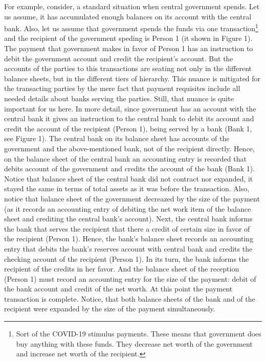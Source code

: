 For example, consider, a standard situation when central government
spends. Let us assume, it has accumulated enough balances on its account
with the central bank. Also, let us assume that government spends the
funds via one transaction\footnote{Sort of the COVID-19 stimulus payments. These means that
    government does buy anything with these funds. They decrease net
    worth of the government and increase net worth of the recipient.} and the recipient of the government
speding is Person 1 (it shown in Figure 1). The payment that government
makes in favor of Person 1 has an instruction to debit the government
account and credit the recipient's account. But the accounts of the
parties to this transactions are seating not only in the different
balance sheets, but in the different tiers of hierarchy. This nuance is
mitigated for the transacting parties by the mere fact that payment
requisites include all needed details about banks serving the parties.
Still, that nuance is quite important for us here. In more detail, since
government has an account with the central bank it gives an instruction
to the central bank to debit its account and credit the account of the
recipient (Person 1), being served by a bank (Bank 1, see Figure 1). The
central bank on its balance sheet has accounts of the government and the
above-mentioned bank, not of the recipient directly. Hence, on the
balance sheet of the central bank an accounting entry is recorded that
debits account of the government and credits the account of the bank
(Bank 1). Notice that balance sheet of the central bank did not contract
nor expanded, it stayed the same in terms of total assets as it was
before the transaction. Also, notice that balance sheet of the
government decreazed by the size of the payment (as it records an
accounting entry of debiting the net work item of the balance sheet and
crediting the central bank's account). Next, the central bank informs
the bank that serves the recipient that there a credit of certain size
in favor of the recipient (Person 1). Hence, the bank's balance sheet
records an accounting entry that debits the bank's reserves account with
central bank and credits the checking account of the recipient (Person
1). In its turn, the bank informs the recipient of the credits in her
favor. And the balance sheet of the reception (Person 1) must record an
accounting entry for the size of the payment: debit of the bank account
and credit of the net worth. At this point the payment transaction is
complete. Notice, that both balance sheets of the bank and of the
recipient were expanded by the size of the payment simultaneously.

